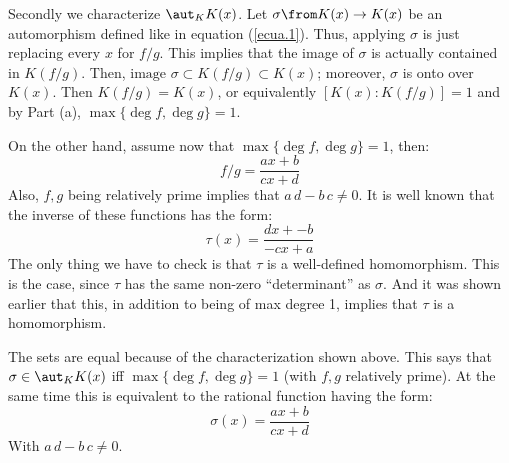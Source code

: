 Secondly we characterize  $\aut_K K(x)$.
Let $\sigma \from K(x) \to K(x)$ be an automorphism defined like in equation (\ref{ecua.1}).
Thus, applying $\sigma$ is just replacing every $x$ for $f/g$.
This implies that the image of $\sigma$ is actually contained in $K(f/g)$. 
Then, $\text{image }\sigma \subset K(f/g) \subset K(x)$; moreover, $\sigma$ is onto over $K(x)$.
Then $K(f/g)=K(x)$, or equivalently $[K(x):K(f/g)]=1$ and by Part (a), $\max\{ \deg f, \deg g\}=1$.

On the other hand, assume now that $\max\{ \deg f, \deg g\}=1$, then:
$$f/g= \frac{ax+b}{cx+d}$$
Also, $f,g$ being relatively prime implies that $a\,d- b\,c\neq 0$. 
It is well known that the inverse of these functions has the form:
$$\tau(x) = \frac{dx+-b}{-cx+a}$$
The only thing we have to check is that $\tau$ is a well-defined homomorphism.
This is the case, since  $\tau$ has the same non-zero ``determinant'' as $\sigma$.
And it was shown earlier that this, in addition to being of max degree 1, implies that $\tau$ is a homomorphism.

The sets are equal because of the characterization shown above. 
This says that $\sigma\in \aut_K K(x)$ iff $\max\{ \deg f, \deg g\}=1$ (with $f,g$ relatively prime).
At the same time this is equivalent to the rational function having the form:
$$\sigma(x) = \frac{ax+b}{cx+d}$$
With $a\,d- b\,c\neq 0$. 
 
